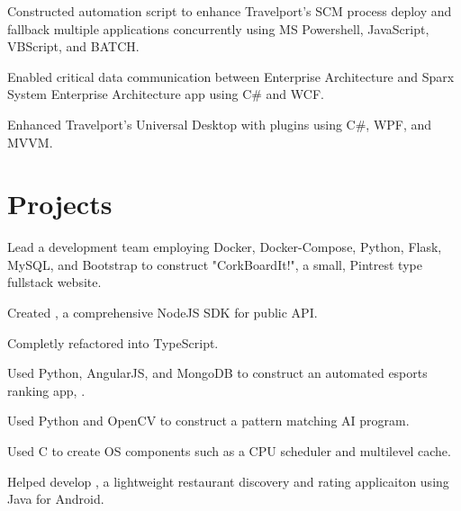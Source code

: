 \documentclass[]{deedy-resume-openfont}
\begin{document}
\begin{minipage}[t]{0.66\textwidth}
\begin{tightemize}
\item Constructed automation script to enhance Travelport's SCM process deploy and fallback multiple applications concurrently using MS Powershell, JavaScript, VBScript, and BATCH.
\item Enabled critical data communication between Enterprise Architecture and Sparx System Enterprise Architecture app using C\# and WCF.
\item Enhanced Travelport's Universal Desktop with plugins using C\#, WPF, and MVVM.
\end{tightemize}
\sectionsep


\section{Projects}
\begin{tightemize} 
\item Lead a development team employing Docker, Docker-Compose, Python, Flask, MySQL, and Bootstrap to construct "CorkBoardIt!", a small, Pintrest type fullstack website. 
\item Created \href{http://npmjs.com/package/smashgg.js}{}, a comprehensive NodeJS SDK for \href{www.smash.gg}{} public API. 
\item Completly refactored {} into TypeScript.
\item Used Python, AngularJS, and MongoDB to construct an automated esports ranking app, \href{https://notgarpr.com}{}.
\item Used Python and OpenCV to construct a pattern matching AI program.
\item Used C to create OS components such as a CPU scheduler and multilevel cache.
\item Helped develop \href{https://play.google.com/store/apps/details?id=com.gmail.japa.arialdis.tasteslikechickenlite\&hl=en}{}, a lightweight restaurant discovery and rating applicaiton using Java for Android.
\end{tightemize}
\sectionsep





\end{minipage} 
\end{document}
